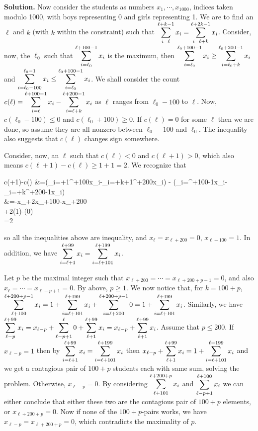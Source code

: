 \documentclass[11pt,a4paper]{article}
\begin{document}
\begin{enumerate}
	\textbf{Solution.} Now consider the students as numbers $x_1, \cdots , x_{1000}$, indices taken modulo 1000, with boys representing 0 and girls representing 1.  We are to find an $\ell$ and $k$ (with $k$ within the constraint) such that $\displaystyle\sum_{i=\ell}^{\ell+k-1}x_i=\displaystyle\sum_{i=\ell+k}^{\ell+2k-1}x_i$. 
	Consider, now, the $\ell_0$ such that $\displaystyle\sum_{i=\ell_0}^{\ell+100-1}x_i$ is the maximum, then 
	$\displaystyle\sum_{i=\ell_0}^{\ell_0+100-1}x_i\ge\displaystyle\sum_{i=\ell_0+k}^{\ell_0+200-1}x_i$ and 
	$\displaystyle\sum_{i=\ell_0-100}^{\ell_0-1}x_i\le\displaystyle\sum_{i=\ell_0}^{\ell_0+100-1}x_i$. 
	We shall consider the count $c(\ell)=\displaystyle\sum_{i=\ell}^{\ell+100-1}x_i-\displaystyle\sum_{i=\ell+k}^{\ell+200-1}x_i$ as $\ell$ ranges from $\ell_0-100$ to $\ell$. 
	Now, $c(\ell_0-100)\le 0$ and $c(\ell_0+100)\ge 0$. 
	If $c(\ell)=0$ for some $\ell$ then we are done, so assume they are all nonzero between $\ell_0-100$ and $\ell_0$. The inequality also suggests that $c(\ell)$ changes sign somewhere. 
	
	Consider, now, an $\ell$ such that $c(\ell)<0$ and $c(\ell+1)>0$, which also means $c(\ell+1)-c(\ell)\ge 1+1=2$. 
	We recognize that 
	\begin{flalign*}
		c(\ell+1)-c(\ell)
		&=(\dsum_{i=\ell+1}^{\ell+100}x_i-\dsum_{i=\ell+k+1}^{\ell+200}x_i) - (\dsum_{i=\ell}^{\ell+100-1}x_i-\dsum_{i=\ell+k}^{\ell+200-1}x_i)\\
		&=-x_{\ell}+2x_{\ell+100}-x_{\ell+200}\\
		+2(1)-(0)\\
		=2
	\end{flalign*}
	so all the inequalities above are inequality, and $x_{\ell}=x_{\ell+200}=0$, $x_{\ell+100}=1$. 
	In addition, we have $\displaystyle\sum_{i=\ell+1}^{\ell+99}x_i=\displaystyle\sum_{i=\ell+101}^{\ell+199}x_i$. 
	
	Let $p$ be the maximal integer such that $x_{\ell+200}=\cdots = x_{\ell+200+p-1}=0$, and also $x_{\ell}=\cdots = x_{\ell-p+1}=0$. By above, $p\ge 1$. 
	We now notice that, for $k=100+p$, $\displaystyle\sum_{\ell+100}^{\ell+200+p-1}x_i=1+\displaystyle\sum_{i=\ell+101}^{\ell+199}x_i + \displaystyle\sum_{i=\ell+200}^{\ell+200+p-1}0=1+\displaystyle\sum_{i=\ell+101}^{\ell+199}x_i$. 
	Similarly, we have $\displaystyle\sum_{\ell-p}^{\ell+99}x_i=x_{\ell-p}+\displaystyle\sum_{\ell-p+1}^{\ell} 0 + \displaystyle\sum_{\ell+1}^{\ell+99}x_i=x_{\ell-p}+ \displaystyle\sum_{\ell+1}^{\ell+99}x_i$. 
	Assume that $p\le 200$. If $x_{\ell-p}=1$ then by $\displaystyle\sum_{i=\ell+1}^{\ell+99}x_i=\displaystyle\sum_{i=\ell+101}^{\ell+199}x_i$ then $x_{\ell-p}+ \displaystyle\sum_{\ell+1}^{\ell+99}x_i=1+\displaystyle\sum_{i=\ell+101}^{\ell+199}x_i$ and we get a contagious pair of $100+p$ students each with same sum, solving the problem. 
	Otherwise, $x_{\ell-p}=0$. 
	By considering $\displaystyle\sum_{\ell+101}^{\ell+200+p}x_i$ and $\displaystyle\sum_{\ell-p+1}^{\ell+100}x_i$ we can either conclude that either these two are the contagious pair of $100+p$ elements, or $x_{\ell+200+p}=0$. Now if none of the $100+p$-pairs works, we have $x_{\ell-p}=x_{\ell+200+p}=0$, which contradicts the maximality of $p$. 
	

\end{enumerate}
\end{document}
